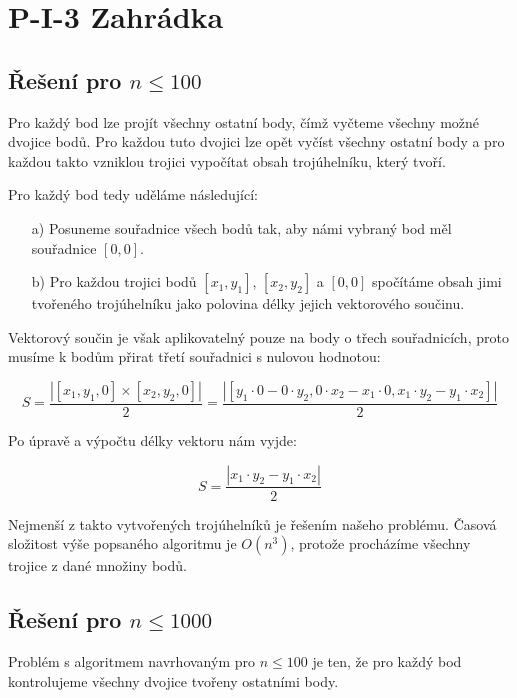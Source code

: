 \documentclass[a4paper, 12pt]{article}
\begin{document}
  \section{P-I-3 Zahrádka}
  
  \subsection{Řešení pro $n\le100$}
  Pro každý bod lze projít všechny ostatní body, čímž vyčteme všechny možné dvojice bodů. Pro každou tuto dvojici lze opět vyčíst všechny ostatní body a pro každou takto vzniklou trojici vypočítat obsah trojúhelníku, který tvoří.

  Pro každý bod tedy uděláme následující:
  \begin{itemize}
    \item[a)] Posuneme souřadnice všech bodů tak, aby námi vybraný bod měl souřadnice $[0,0]$.
    \item[b)] Pro každou trojici bodů $[x_1,y_1]$, $[x_2,y_2]$ a $[0,0]$ spočítáme obsah jimi tvořeného trojúhelníku jako polovina délky jejich vektorového součinu.
  \end{itemize}

  Vektorový součin je však aplikovatelný pouze na body o třech souřadnicích, proto musíme k bodům přirat třetí souřadnici s nulovou hodnotou:

  \begin{equation*}
    S=\frac{| [x_1,y_1,0]\times[x_2,y_2,0] |}{2}
    =\frac{| [y_1 \cdot 0 - 0 \cdot y_2, 0 \cdot x_2 - x_1 \cdot 0, x_1 \cdot y_2 - y_1 \cdot x_2] |}{2}
  \end{equation*}

  Po úpravě a výpočtu délky vektoru nám vyjde:

  \begin{equation*}
    S=\frac{| x_1 \cdot y_2 - y_1 \cdot x_2 |}{2}
  \end{equation*}

  Nejmenší z takto vytvořených trojúhelníků je řešením našeho problému. Časová složitost výše popsaného algoritmu je $O(n^3)$, protože procházíme všechny trojice z dané množiny bodů.

  \subsection{Řešení pro $n\le1000$}
  Problém s algoritmem navrhovaným pro $n\le100$ je ten, že pro každý bod kontrolujeme všechny dvojice tvořeny ostatními body.
\end{document}
